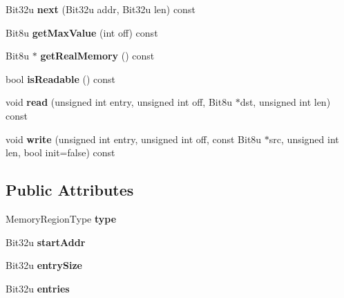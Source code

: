 \begin{DoxyCompactItemize}
\item 
\hypertarget{classMT32Emu_1_1MemoryRegion_a181eb20b187160e5f48f635c5d4392ff}{Bit32u {\bfseries next} (Bit32u addr, Bit32u len) const }\label{classMT32Emu_1_1MemoryRegion_a181eb20b187160e5f48f635c5d4392ff}

\item 
\hypertarget{classMT32Emu_1_1MemoryRegion_a766ae7e2f41b0e0ed3ae833906eb67f2}{Bit8u {\bfseries get\-Max\-Value} (int off) const }\label{classMT32Emu_1_1MemoryRegion_a766ae7e2f41b0e0ed3ae833906eb67f2}

\item 
\hypertarget{classMT32Emu_1_1MemoryRegion_a0f5fa61a82fbc7ec6afb683765e12fcb}{Bit8u $\ast$ {\bfseries get\-Real\-Memory} () const }\label{classMT32Emu_1_1MemoryRegion_a0f5fa61a82fbc7ec6afb683765e12fcb}

\item 
\hypertarget{classMT32Emu_1_1MemoryRegion_a48b143665c41792a58250bfeeb598144}{bool {\bfseries is\-Readable} () const }\label{classMT32Emu_1_1MemoryRegion_a48b143665c41792a58250bfeeb598144}

\item 
\hypertarget{classMT32Emu_1_1MemoryRegion_a6d35bbd59c7289ea32d99ed4c73cf8d2}{void {\bfseries read} (unsigned int entry, unsigned int off, Bit8u $\ast$dst, unsigned int len) const }\label{classMT32Emu_1_1MemoryRegion_a6d35bbd59c7289ea32d99ed4c73cf8d2}

\item 
\hypertarget{classMT32Emu_1_1MemoryRegion_a7ca35d02703155ca6a78cfdb3b17b3ad}{void {\bfseries write} (unsigned int entry, unsigned int off, const Bit8u $\ast$src, unsigned int len, bool init=false) const }\label{classMT32Emu_1_1MemoryRegion_a7ca35d02703155ca6a78cfdb3b17b3ad}

\end{DoxyCompactItemize}
\subsection*{Public Attributes}
\begin{DoxyCompactItemize}
\item 
\hypertarget{classMT32Emu_1_1MemoryRegion_a8f581fd41666ac78640ab29b2f84a342}{Memory\-Region\-Type {\bfseries type}}\label{classMT32Emu_1_1MemoryRegion_a8f581fd41666ac78640ab29b2f84a342}

\item 
\hypertarget{classMT32Emu_1_1MemoryRegion_add0a2fa21c5c53a2924a0d78cdc5c1a2}{Bit32u {\bfseries start\-Addr}}\label{classMT32Emu_1_1MemoryRegion_add0a2fa21c5c53a2924a0d78cdc5c1a2}

\item 
\hypertarget{classMT32Emu_1_1MemoryRegion_afb5de9e948dfcb938177cd78b9f192f8}{Bit32u {\bfseries entry\-Size}}\label{classMT32Emu_1_1MemoryRegion_afb5de9e948dfcb938177cd78b9f192f8}

\item 
\hypertarget{classMT32Emu_1_1MemoryRegion_ab41fff9f33adec9e3e7c3733076618de}{Bit32u {\bfseries entries}}\label{classMT32Emu_1_1MemoryRegion_ab41fff9f33adec9e3e7c3733076618de}

\end{DoxyCompactItemize}


